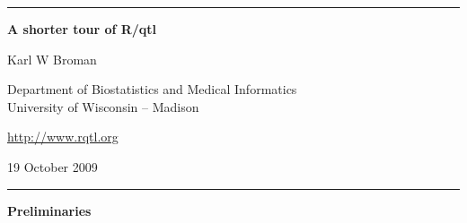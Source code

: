 \documentclass[10pt,letterpaper]{article}
\begin{document}
\begin{center}
\rule{7.0in}{1mm} \vspace{0mm}

{\Large \textbf{A shorter tour of R/qtl}} \vspace{4mm}

{\large Karl W Broman} \vspace{2mm}

Department of Biostatistics and Medical Informatics\\
University of Wisconsin -- Madison

\vspace{2mm}
\href{http://www.rqtl.org}{http://www.rqtl.org}
\vspace{2mm}

19 October 2009 %

\rule{7.0in}{1mm} 
\end{center}



\textbf{Preliminaries} \vspace{6pt}
\end{document}
